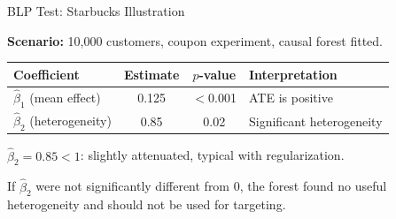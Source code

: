 \documentclass[aspectratio=169, 11pt, handout]{beamer}
\begin{document}
\begin{frame}{BLP Test: Starbucks Illustration}
 
\textbf{Scenario:} 10,000 customers, coupon experiment, causal forest fitted.
 
\bigskip
 
\begin{center}
\begin{tabular}{lccl}
\toprule
\textbf{Coefficient} & \textbf{Estimate} & \textbf{$p$-value} & \textbf{Interpretation} \\
\midrule
$\hat{\beta}_1$ (mean effect) & 0.125 & $<$0.001 & ATE is positive \\[0.5em]
$\hat{\beta}_2$ (heterogeneity) & 0.85 & 0.02 & Significant heterogeneity \\
\bottomrule
\end{tabular}
\end{center}
 
\pause
\bigskip
 
$\hat{\beta}_2 = 0.85 < 1$: slightly attenuated, typical with regularization.
 
\pause
\medskip
 
If $\hat{\beta}_2$ were not significantly different from 0, the forest found no useful heterogeneity and should not be used for targeting.
 
\end{frame}
 
\end{document}
